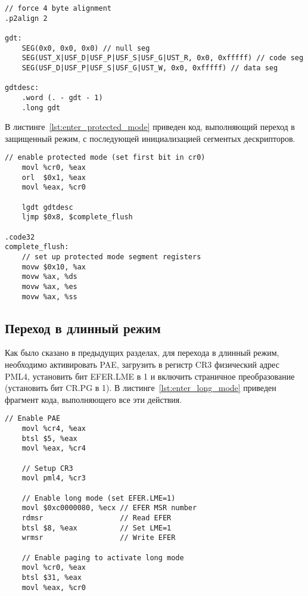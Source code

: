 \begin{lstlisting}[language={[x86masm]Assembler},
caption={Объявление GDT и ее дескриптора},label={lst:declare_gdt}]
// force 4 byte alignment
.p2align 2

gdt:
	SEG(0x0, 0x0, 0x0) // null seg
	SEG(UST_X|USF_D|USF_P|USF_S|USF_G|UST_R, 0x0, 0xfffff) // code seg
	SEG(USF_D|USF_P|USF_S|USF_G|UST_W, 0x0, 0xfffff) // data seg

gdtdesc:
	.word (. - gdt - 1)
	.long gdt
\end{lstlisting}

В листинге~\ref{lst:enter_protected_mode} приведен код, выполняющий переход в защищенный режим,
с последующей инициализацией сегментых дескрипторов.
\begin{lstlisting}[language={[x86masm]Assembler},
caption={Переход в защищенный режим},label={lst:enter_protected_mode}]
	// enable protected mode (set first bit in cr0)
	movl %cr0, %eax
	orl  $0x1, %eax
	movl %eax, %cr0

	lgdt gdtdesc
	ljmp $0x8, $complete_flush

.code32
complete_flush:
	// set up protected mode segment registers
	movw $0x10, %ax
	movw %ax, %ds
	movw %ax, %es
	movw %ax, %ss
\end{lstlisting}

\subsection{Переход в длинный режим}
Как было сказано в предыдущих разделах, для перехода в длинный режим, необходимо
активировать PAE, загрузить в регистр CR3 физический адрес PML4, установить бит
EFER.LME в 1 и включить страничное преобразование (установить бит CR.PG в 1). В
листинге~\ref{lst:enter_long_mode} приведен фрагмент кода, выполняющего все эти действия.

\begin{lstlisting}[language={[x86masm]Assembler},
caption={Переход в длинный режим},label={lst:enter_long_mode}]
	// Enable PAE
	movl %cr4, %eax
	btsl $5, %eax
	movl %eax, %cr4

	// Setup CR3
	movl pml4, %cr3

	// Enable long mode (set EFER.LME=1)
	movl $0xc0000080, %ecx // EFER MSR number
	rdmsr                  // Read EFER
	btsl $8, %eax          // Set LME=1
	wrmsr                  // Write EFER

	// Enable paging to activate long mode
	movl %cr0, %eax
	btsl $31, %eax
	movl %eax, %cr0
\end{lstlisting}

